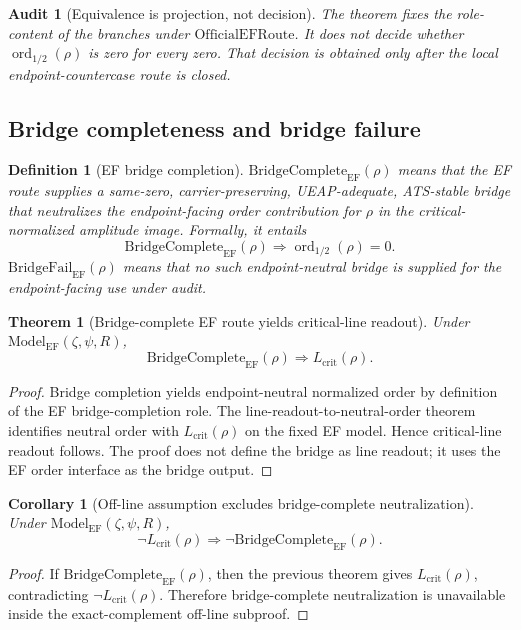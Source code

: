 \documentclass[11pt]{article}
\newtheorem{definition}{Definition}[section]
\newtheorem{theorem}{Theorem}[section]
\newtheorem{corollary}{Corollary}[section]
\newtheorem{audit}{Audit}[section]
\newcommand{\Lcrit}{L_{\mathrm{crit}}}
\newcommand{\ModelEF}{\mathrm{Model}_{\mathrm{EF}}}
\newcommand{\OfficialEFRoute}{\mathrm{OfficialEFRoute}}
\newcommand{\ordhalf}{\operatorname{ord}_{1/2}}
\newcommand{\BridgeCompleteEF}{\mathrm{BridgeComplete}_{\mathrm{EF}}}
\newcommand{\BridgeFailEF}{\mathrm{BridgeFail}_{\mathrm{EF}}}
\begin{document}
\begin{audit}[Equivalence is projection, not decision]
The theorem fixes the role-content of the branches under \(\OfficialEFRoute\).  It does not decide whether \(\ordhalf(\rho)\) is zero for every zero.  That decision is obtained only after the local endpoint-countercase route is closed.
\end{audit}

\subsection{Bridge completeness and bridge failure}

\begin{definition}[EF bridge completion]
\(\BridgeCompleteEF(\rho)\) means that the EF route supplies a same-zero, carrier-preserving, UEAP-adequate, ATS-stable bridge that neutralizes the endpoint-facing order contribution for \(\rho\) in the critical-normalized amplitude image.  Formally, it entails
\[
\BridgeCompleteEF(\rho)\Rightarrow \ordhalf(\rho)=0.
\]
\(\BridgeFailEF(\rho)\) means that no such endpoint-neutral bridge is supplied for the endpoint-facing use under audit.
\end{definition}

\begin{theorem}[Bridge-complete EF route yields critical-line readout]
Under \(\ModelEF(\zeta,\psi,R)\),
\[
\BridgeCompleteEF(\rho)\Rightarrow \Lcrit(\rho).
\]
\end{theorem}

\begin{proof}
Bridge completion yields endpoint-neutral normalized order by definition of the EF bridge-completion role.  The line-readout-to-neutral-order theorem identifies neutral order with \(\Lcrit(\rho)\) on the fixed EF model.  Hence critical-line readout follows.  The proof does not define the bridge as line readout; it uses the EF order interface as the bridge output.
\end{proof}

\begin{corollary}[Off-line assumption excludes bridge-complete neutralization]
Under \(\ModelEF(\zeta,\psi,R)\),
\[
\neg\Lcrit(\rho)\Rightarrow \neg\BridgeCompleteEF(\rho).
\]
\end{corollary}

\begin{proof}
If \(\BridgeCompleteEF(\rho)\), then the previous theorem gives \(\Lcrit(\rho)\), contradicting \(\neg\Lcrit(\rho)\).  Therefore bridge-complete neutralization is unavailable inside the exact-complement off-line subproof.
\end{proof}
\end{document}
